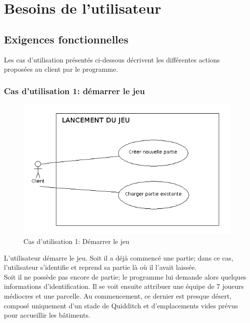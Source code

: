 \documentclass[a4paper,titlepage]{scrreprt}
\begin{document}
\chapter{Besoins de l'utilisateur}
  
  
\section{Exigences fonctionnelles}
  
  Les cas d'utilisation présentés ci-dessous décrivent les différentes actions proposées au client par le programme.

  \subsection{Cas d'utilisation 1: démarrer le jeu}
  \begin{figure}[H]
    \center
    \includegraphics[scale=0.5]{uml/useCaseView/Lancementdujeu.png}
    \caption{Cas d'utilisation 1: Démarrer le jeu}
  \end{figure}	
    L'utilisateur démarre le jeu. Soit il a déjà commencé une \gls{partie}; dans ce cas, l'utilisateur s'identifie et reprend sa partie là où il l'avait laissée. \\
    Soit il ne possède pas encore de partie; le programme lui demande alors quelques informations d'identification. 
    Il se voit ensuite attribuer une équipe de 7 \gls{joueur}s médiocres et une \gls{parcelle}. 
    Au commencement, ce dernier est presque désert, composé uniquement d'un 
    \gls{stade} de \gls{Quidditch} et d'emplacements vides prévus pour accueillir les bâtiments.
\end{document}
